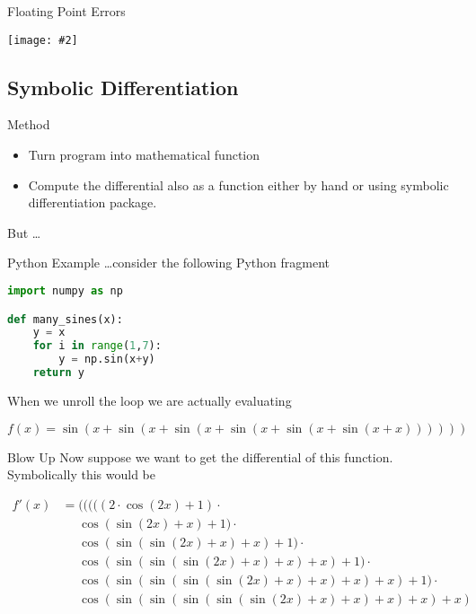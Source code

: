 \documentclass{beamer}
\newcommand {\framedgraphic}[2] {
    \begin{frame}{#1}
        \begin{center}
            \texttt{[image: \#2]}
        \end{center}
    \end{frame}
}
\begin{document}
\framedgraphic{Floating Point Errors}{diagrams/13a2bd186a0e123f040da9491fa98684.png}

\subsection{Symbolic Differentiation}
\begin{frame}[fragile]{Method}
\begin{itemize}
\item
Turn program into mathematical function
\item
Compute the differential also as a function either by hand or using
symbolic differentiation package.
\end{itemize}

But \ldots
\end{frame}

\begin{frame}[fragile]{Python Example}
\ldots consider the following Python fragment
\begin{lstlisting}[language=Python]
import numpy as np

def many_sines(x):
    y = x
    for i in range(1,7):
        y = np.sin(x+y)
    return y
\end{lstlisting}

When we unroll the loop we are actually evaluating

$$
f(x) = \sin(x + \sin(x + \sin(x + \sin(x + \sin(x + \sin(x + x))))))
$$

\end{frame}

\begin{frame}[fragile]{Blow Up}
Now suppose we want to get the differential of this
function. Symbolically this would be

$$
\begin{aligned}
f'(x) &=           (((((2\cdot \cos(2x)+1)\cdot \\
      &\phantom{=} \cos(\sin(2x)+x)+1)\cdot \\
      &\phantom{=} \cos(\sin(\sin(2x)+x)+x)+1)\cdot \\
      &\phantom{=} \cos(\sin(\sin(\sin(2x)+x)+x)+x)+1)\cdot \\
      &\phantom{=} \cos(\sin(\sin(\sin(\sin(2x)+x)+x)+x)+x)+1)\cdot \\
      &\phantom{=} \cos(\sin(\sin(\sin(\sin(\sin(2x)+x)+x)+x)+x)+x)
\end{aligned}
$$
\end{frame}
\end{document}

